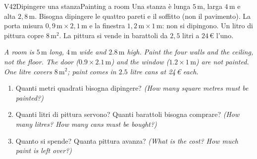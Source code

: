 \documentclass[11pt,a4paper]{article}
\newcommand{\en}[1]{\par{\small\itshape\color{engray}#1\par}}
\newcommand{\enx}[1]{{\small\itshape\color{engray}(#1)}}
\newcommand{\unit}[1]{\,\mathrm{#1}}
\newcommand{\mq}{\unit{m^2}}
\begin{document}
\begin{esercizio}{V4}{2}{Dipingere una stanza}{Painting a room}
Una stanza è lunga $5\unit{m}$, larga $4\unit{m}$ e alta $2,8\unit{m}$. Bisogna dipingere le quattro pareti e il soffitto (non il pavimento). La porta misura $0,9\unit{m}\times2,1\unit{m}$ e la finestra $1,2\unit{m}\times1\unit{m}$: non si dipingono.
Un litro di pittura copre $8\mq$. La pittura si vende in barattoli da $2,5$ litri a $24$\,€ l'uno.
\en{A room is $5\unit{m}$ long, $4\unit{m}$ wide and $2.8\unit{m}$ high. Paint the four walls and the ceiling, not the floor. The door ($0.9 \times 2.1\unit{m}$) and the window ($1.2 \times 1\unit{m}$) are not painted. One litre covers $8\mq$; paint comes in $2.5$ litre cans at 24\,€ each.}
\begin{enumerate}
\item Quanti metri quadrati bisogna dipingere? \enx{How many square metres must be painted?}
\item Quanti litri di pittura servono? Quanti barattoli bisogna comprare? \enx{How many litres? How many cans must be bought?}
\item Quanto si spende? Quanta pittura avanza? \enx{What is the cost? How much paint is left over?}
\end{enumerate}
\begin{center}
\end{center}
\end{esercizio}
\end{document}
